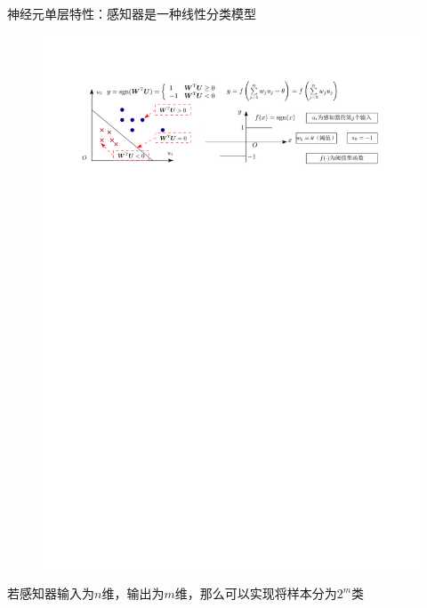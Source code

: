 \begin{note}
    神经元单层特性：感知器是一种线性分类模型
    \begin{figure}[htbp]
        \centering
        \includegraphics[width = .9\textwidth]{image/神经元单元特性.pdf}
    \end{figure}
\end{note}
\begin{example}
    若感知器输入为$n$维，输出为$m$维，那么可以实现将样本分为\underline{$2^m$}类
\end{example}
